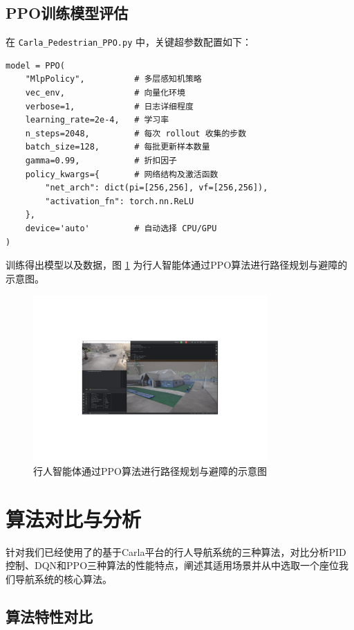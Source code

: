 \subsection{PPO训练模型评估}
在 \texttt{Carla\_Pedestrian\_PPO.py} 中，关键超参数配置如下：
\begin{verbatim}
model = PPO(
    "MlpPolicy",          # 多层感知机策略
    vec_env,              # 向量化环境
    verbose=1,            # 日志详细程度
    learning_rate=2e-4,   # 学习率
    n_steps=2048,         # 每次 rollout 收集的步数
    batch_size=128,       # 每批更新样本数量
    gamma=0.99,           # 折扣因子
    policy_kwargs={       # 网络结构及激活函数
        "net_arch": dict(pi=[256,256], vf=[256,256]),
        "activation_fn": torch.nn.ReLU
    },
    device='auto'         # 自动选择 CPU/GPU
)
\end{verbatim}

训练得出模型以及数据，图 \ref{fig:path_planning} 为行人智能体通过PPO算法进行路径规划与避障的示意图。

\begin{figure}[H]
    \centering
    \includegraphics[width=0.8\textwidth]{images/path_planning.pdf}
    \caption{行人智能体通过PPO算法进行路径规划与避障的示意图}
    \label{fig:path_planning}
\end{figure}

\section{算法对比与分析}

针对我们已经使用了的基于Carla平台的行人导航系统的三种算法，对比分析PID控制、DQN和PPO三种算法的性能特点，阐述其适用场景并从中选取一个座位我们导航系统的核心算法。

\subsection{算法特性对比}

